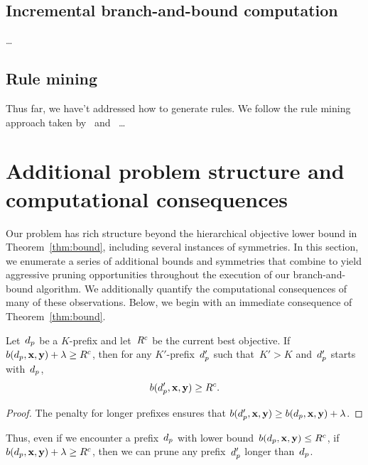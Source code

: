 \subsection{Incremental branch-and-bound computation}

\dots

\subsection{Rule mining}

Thus far, we have't addressed how to generate rules.
%
We follow the rule mining approach taken by~\citet{LethamRuMcMa15}
and~\citet{YangRuSe16} \dots

\section{Additional problem structure and computational consequences}

Our problem has rich structure beyond the hierarchical objective lower bound
in Theorem~\ref{thm:bound}, including several instances of symmetries.
%
In this section, we enumerate a series of additional bounds and
symmetries that combine to yield aggressive pruning opportunities
throughout the execution of our branch-and-bound algorithm.
%
We additionally quantify the computational consequences of many
of these observations.
%
Below, we begin with an immediate consequence of Theorem~\ref{thm:bound}.

\begin{theorem}
Let~$d_p$ be a $K$-prefix
and let~${R^c}$ be the current best objective.
%
If ${b(d_p, \mathbf{x}, \mathbf{y}) + {\lambda} \ge {R^c}}$,
then for any $K'$-prefix~$d_p'$ such that~${K' > K}$
and~$d_p'$ starts with~$d_p$,
\begin{align}
 b(\Prefix', \x, \y) \ge \CurrentObj.
\label{eq:lookahead}
\end{align}
\end{theorem}

\begin{proof}
The penalty for longer prefixes ensures that
${b(d_p', \mathbf{x}, \mathbf{y}) \ge b(d_p, \mathbf{x}, \mathbf{y}) + {\lambda}}$.
\end{proof}

Thus, even if we encounter a prefix~$d_p$
with lower bound~${b(d_p, \mathbf{x}, \mathbf{y}) \le {R^c}}$,
if ${b(d_p, \mathbf{x}, \mathbf{y}) + {\lambda} \ge {R^c}}$,
then we can prune any prefix~$d_p'$ longer than~$d_p$. \\

